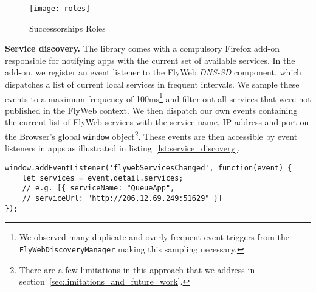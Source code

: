 \begin{figure}[h]
    \centering
    \texttt{[image: roles]}
    \caption{Successorships Roles}
    \label{fig:roles}
\end{figure}

\noindent\textbf{Service discovery.} 
The \APIshort library comes with a compulsory Firefox add-on responsible for notifying apps with the current set of available \APIshort services. 
In the add-on, we register an event listener to the FlyWeb \textit{DNS-SD} component, which dispatches a list of current local services in frequent intervals.
We sample these events to a maximum frequency of 100ms\footnote{We observed many duplicate and overly frequent event triggers from the \texttt{FlyWebDiscoveryManager} making this sampling necessary.} and filter out all services that were not published in the FlyWeb context. 
We then dispatch our own events containing the current list of FlyWeb services with the service name, IP address and port on the Browser's global \texttt{window} object\footnote{There are a few limitations in this approach that we address in section~\ref{sec:limitations_and_future_work}.}. 
These events are then accessible by event listeners in \APIshort apps as illustrated in listing~\ref{lst:service_discovery}.

\begin{lstlisting}[caption={Event listener for service discovery},label={lst:service_discovery}]
window.addEventListener('flywebServicesChanged', function(event) {
    let services = event.detail.services;
    // e.g. [{ serviceName: "QueueApp",
    // serviceUrl: "http://206.12.69.249:51629" }]
});
\end{lstlisting}

